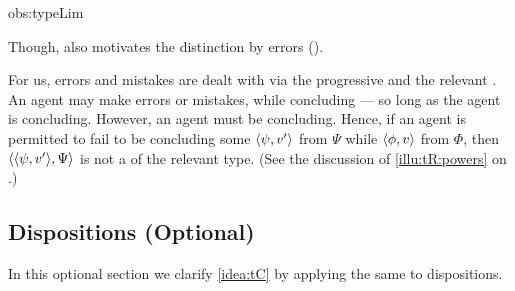 \begin{note}
\begin{motivation}{obs:typeLim}
{    Though, \citeauthor{Chomsky:2015aa} also motivates the distinction by errors (\citeyear[2]{Chomsky:2015aa}).

    For us, errors and mistakes are dealt with via the progressive and the relevant \torN{}.
    An agent may make errors or mistakes, while concluding --- so long as the agent is concluding.
    However, an agent must be concluding.
    Hence, if an agent is permitted to fail to be concluding some \(\langle \psi, v' \rangle\) from \(\Psi\) while \tCV{} \(\langle \phi, v \rangle\) from \(\Phi\), then \(\langle \langle \psi, v' \rangle, \Psi \rangle\) is not a \tI{} of the relevant type.
    (See the discussion of \autoref{illu:tR:powers} on .)
}
  \end{motivation}

\end{note}


\subsection[Dispositions]{Dispositions \hfill (Optional)}
\label{sec:dispositions}

\begin{note}
  In this optional section we clarify \autoref{idea:tC} by applying the same to dispositions.
\end{note}

